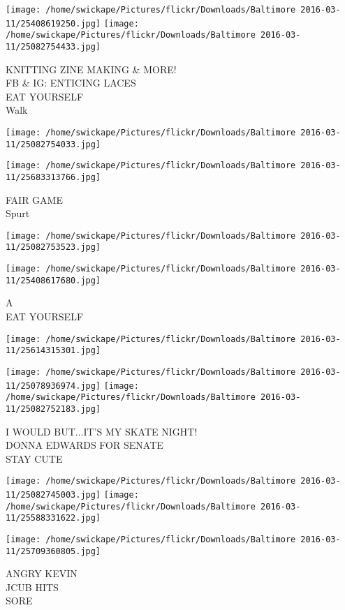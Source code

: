 \documentclass[10pt,letterpaper]{article}
\begin{document}
\texttt{[image: /home/swickape/Pictures/flickr/Downloads/Baltimore 2016-03-11/25408619250.jpg]}
\texttt{[image: /home/swickape/Pictures/flickr/Downloads/Baltimore 2016-03-11/25082754433.jpg]}

KNITTING ZINE MAKING \& MORE!\\
FB \& IG: ENTICING LACES\\
EAT YOURSELF\\
Walk
\pagebreak

\texttt{[image: /home/swickape/Pictures/flickr/Downloads/Baltimore 2016-03-11/25082754033.jpg]}

\vspace{0.25in}
\texttt{[image: /home/swickape/Pictures/flickr/Downloads/Baltimore 2016-03-11/25683313766.jpg]}

FAIR GAME\\
Spurt
\pagebreak

\texttt{[image: /home/swickape/Pictures/flickr/Downloads/Baltimore 2016-03-11/25082753523.jpg]}

\vspace{0.25in}
\texttt{[image: /home/swickape/Pictures/flickr/Downloads/Baltimore 2016-03-11/25408617680.jpg]}

A\\
EAT YOURSELF
\pagebreak

\texttt{[image: /home/swickape/Pictures/flickr/Downloads/Baltimore 2016-03-11/25614315301.jpg]}

\vspace{0.25in}
\texttt{[image: /home/swickape/Pictures/flickr/Downloads/Baltimore 2016-03-11/25078936974.jpg]}
\texttt{[image: /home/swickape/Pictures/flickr/Downloads/Baltimore 2016-03-11/25082752183.jpg]}

I WOULD BUT...IT'S MY SKATE NIGHT!\\
DONNA EDWARDS FOR SENATE\\
STAY CUTE
\pagebreak

\texttt{[image: /home/swickape/Pictures/flickr/Downloads/Baltimore 2016-03-11/25082745003.jpg]}
\texttt{[image: /home/swickape/Pictures/flickr/Downloads/Baltimore 2016-03-11/25588331622.jpg]}

\texttt{[image: /home/swickape/Pictures/flickr/Downloads/Baltimore 2016-03-11/25709360805.jpg]}

ANGRY KEVIN\\
JCUB HITS\\
SORE
\pagebreak
\end{document}
